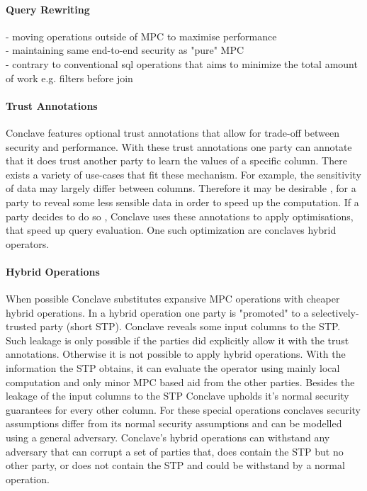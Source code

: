 \paragraph{Query Rewriting}
- moving operations outside of MPC to maximise performance\\
- maintaining same end-to-end security as "pure" MPC     \\
- contrary to conventional sql operations that aims to minimize the total amount of work e.g. filters before join \\


\paragraph{Trust Annotations}
Conclave features optional trust annotations that allow for trade-off between security and performance. With these trust annotations one party can annotate that it does trust another party to learn the values of a specific column. There exists a variety of use-cases that fit these mechanism. For example, the sensitivity of data may largely differ between columns. Therefore it may be desirable , for a party to reveal some less sensible data in order to speed up the computation. If a party decides to do so , Conclave uses these annotations to apply optimisations, that speed up query evaluation. One such optimization are conclaves hybrid operators.
\paragraph{Hybrid Operations}
When possible Conclave substitutes expansive MPC operations with cheaper hybrid operations. In a hybrid operation one party is "promoted" to a selectively-trusted party (short STP). Conclave reveals some input columns to the STP. Such leakage is only possible if the parties did explicitly allow it with the trust annotations. Otherwise it is not possible to apply hybrid operations. With the information the STP obtains, it can evaluate the operator using mainly local computation and only minor MPC based aid from the other parties. Besides the leakage of the input columns to the STP Conclave upholds it's normal security guarantees for every other column. For these special operations conclaves security assumptions differ from its normal security assumptions and can be modelled using a general adversary. Conclave's hybrid operations can withstand any adversary that can corrupt a set of parties that, does contain the STP but no other party, or does not contain the STP and could be withstand by a normal operation. 
